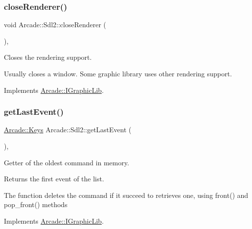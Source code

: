 \subsubsection{\texorpdfstring{close\+Renderer()}{closeRenderer()}}
{\footnotesize\ttfamily void Arcade\+::\+Sdl2\+::close\+Renderer (\begin{DoxyParamCaption}{ }\end{DoxyParamCaption})\hspace{0.3cm}{\ttfamily [final]}, {\ttfamily [virtual]}}



Closes the rendering support. 

Usually closes a window. Some graphic library uses other rendering support. 

Implements \hyperlink{class_arcade_1_1_i_graphic_lib_aa7c3c8b922fbc94f5e74ecfebad52742}{Arcade\+::\+I\+Graphic\+Lib}.

\mbox{\label{class_arcade_1_1_sdl2_a6d5bda09e7705c6ccef7451694621247}} 
\subsubsection{\texorpdfstring{get\+Last\+Event()}{getLastEvent()}}
{\footnotesize\ttfamily \hyperlink{namespace_arcade_a9b501908b20bc993e4f8226db5323c41}{Arcade\+::\+Keys} Arcade\+::\+Sdl2\+::get\+Last\+Event (\begin{DoxyParamCaption}{ }\end{DoxyParamCaption})\hspace{0.3cm}{\ttfamily [final]}, {\ttfamily [virtual]}}



Getter of the oldest command in memory. 

\begin{DoxyReturn}{Returns}
the first event of the list.
\end{DoxyReturn}
The function deletes the command if it succeed to retrieves one, using front() and pop\+\_\+front() methods 

Implements \hyperlink{class_arcade_1_1_i_graphic_lib_a801ebd3cff2c861e4b2a1e664c123da7}{Arcade\+::\+I\+Graphic\+Lib}.

\mbox{\label{class_arcade_1_1_sdl2_a9e9e70db8a77c2dee10e2227c70415e3}} 
